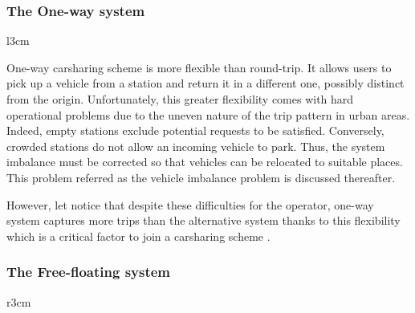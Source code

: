 \begin{bibunit}[ieeetr]
\subsubsection{The One-way system}

\begin{wrapfigure}[6]{l}{3cm}
\vspace{-.4cm}
\centering
{}
\end{wrapfigure}

One-way carsharing scheme is more flexible than round-trip.
It allows users to pick up a vehicle from a station and return it in a different one, possibly distinct from the origin.
Unfortunately, this greater flexibility comes with hard operational problems due to the uneven nature of the trip pattern in urban areas.
Indeed, empty stations exclude potential requests to be satisfied.
Conversely, crowded stations do not allow an incoming vehicle to park.
Thus, the system imbalance must be corrected so that vehicles can be relocated to suitable places.
This problem referred as the vehicle imbalance problem is discussed thereafter.

However, let notice that despite these difficulties for the operator, one-way system captures more trips than the alternative system thanks to this flexibility which is a critical factor to join a carsharing scheme \cite{efthymiou_which_2012}.


\subsubsection{The Free-floating system}

\begin{wrapfigure}[6]{r}{3cm}
\vspace{-.4cm}
\centering
{}
\end{wrapfigure}


\end{bibunit}
